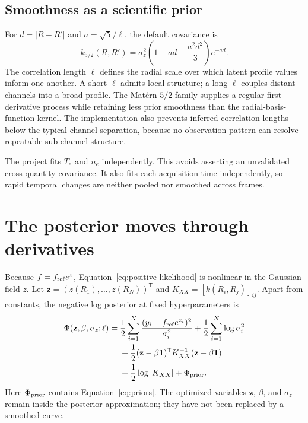 \documentclass[10pt,twocolumn]{article}
\newcommand{\Te}{T_e}
\newcommand{\nelec}{n_e}
\begin{document}
\subsection{Smoothness as a scientific prior}

For $d=|R-R'|$ and $a=\sqrt{5}/\ell$, the default covariance is
\begin{equation}
k_{5/2}(R,R')=\sigma_z^2
\left(1+ad+\frac{a^2d^2}{3}\right)e^{-ad}.
\label{eq:matern}
\end{equation}
The correlation length $\ell$ defines the radial scale over which latent
profile values inform one another.  A short $\ell$ admits local structure; a
long $\ell$ couples distant channels into a broad profile.  The Mat\'ern-$5/2$
family supplies a regular first-derivative process while retaining less prior
smoothness than the radial-basis-function kernel.  The implementation also
prevents inferred correlation lengths below the typical channel separation,
because no observation pattern can resolve repeatable sub-channel structure.

The project fits $\Te$ and $\nelec$ independently.  This avoids asserting an
unvalidated cross-quantity covariance.  It also fits each acquisition time
independently, so rapid temporal changes are neither pooled nor smoothed across
frames.

\section{The posterior moves through derivatives}

Because $f=f_{\rm ref}e^z$, Equation~\eqref{eq:positive-likelihood} is
nonlinear in the Gaussian field $z$.  Let
$\mathbf z=(z(R_1),\ldots,z(R_N))^{\mathsf T}$ and
$K_{XX}=[k(R_i,R_j)]_{ij}$.  Apart from constants, the negative log posterior
at fixed hyperparameters is
\begin{align}
\Phi(\mathbf z,\beta,\sigma_z;\ell)
={}&\frac12\sum_{i=1}^{N}
\frac{(y_i-f_{\rm ref}e^{z_i})^2}{\sigma_i^2}
+\frac12\sum_{i=1}^{N}\log\sigma_i^2 \notag\\
&+\frac12(\mathbf z-\beta\mathbf1)^{\mathsf T}
K_{XX}^{-1}(\mathbf z-\beta\mathbf1)\notag\\
&+\frac12\log|K_{XX}|+\Phi_{\rm prior}.
\label{eq:objective}
\end{align}
Here $\Phi_{\rm prior}$ contains Equation~\eqref{eq:priors}.  The optimized
variables $\mathbf z$, $\beta$, and $\sigma_z$ remain inside the posterior
approximation; they have not been replaced by a smoothed curve.
\end{document}
